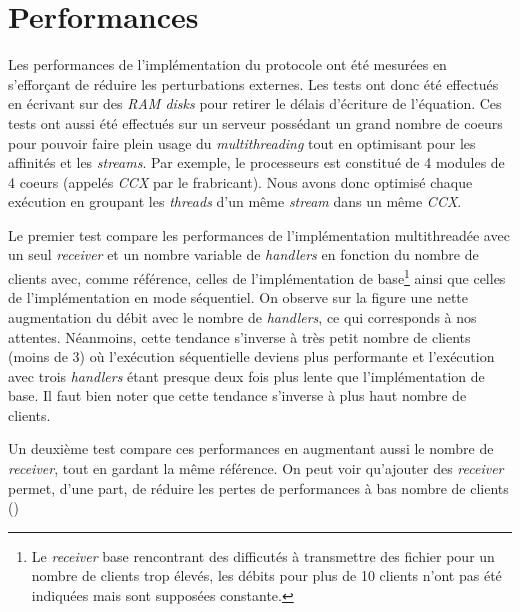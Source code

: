 \documentclass[../main.tex]{subfiles}
\begin{document}
\section{Performances}
\label{sec:performances}

Les performances de l'implémentation du protocole ont été mesurées en s'efforçant de réduire les perturbations externes. Les tests ont donc été 
effectués en écrivant sur des \textit{RAM disks} pour retirer le délais d'écriture de l'équation. Ces tests ont aussi été effectués sur un serveur 
possédant un grand nombre de coeurs pour pouvoir faire plein usage du \textit{multithreading} tout en optimisant pour les affinités et les \textit{streams}.
Par exemple, le processeurs est constitué de 4 modules de 4 coeurs (appelés \textit{CCX} par le frabricant). Nous avons donc optimisé chaque exécution
en groupant les \textit{threads} d'un même \textit{stream} dans un même \textit{CCX}.

Le premier test compare les performances de l'implémentation multithreadée avec un seul \textit{receiver} et un nombre variable de \textit{handlers}  %
en fonction du nombre de clients avec, comme référence, celles de l'implémentation de base\footnote{Le \textit{receiver} base rencontrant des 
difficutés à transmettre des fichier pour un nombre de clients trop élevés, les débits pour plus de 10 clients n'ont pas été indiquées mais sont 
supposées constante.} ainsi que celles de l'implémentation en mode séquentiel.          %
On observe sur la figure une nette augmentation du débit avec le nombre de \textit{handlers}, ce qui corresponds à nos attentes. Néanmoins, cette 
tendance s'inverse à très petit nombre de clients (moins de 3) où l'exécution séquentielle deviens plus performante et l'exécution avec trois \textit{handlers} étant 
presque deux fois plus lente que l'implémentation de base. Il faut bien noter que cette tendance s'inverse à plus haut nombre de clients.

Un deuxième test compare ces performances en augmentant aussi le nombre de \textit{receiver}, tout en gardant la même référence. On peut voir qu'ajouter 
des \textit{receiver} permet, d'une part, de réduire les pertes de performances à bas nombre de clients ()
\end{document}
